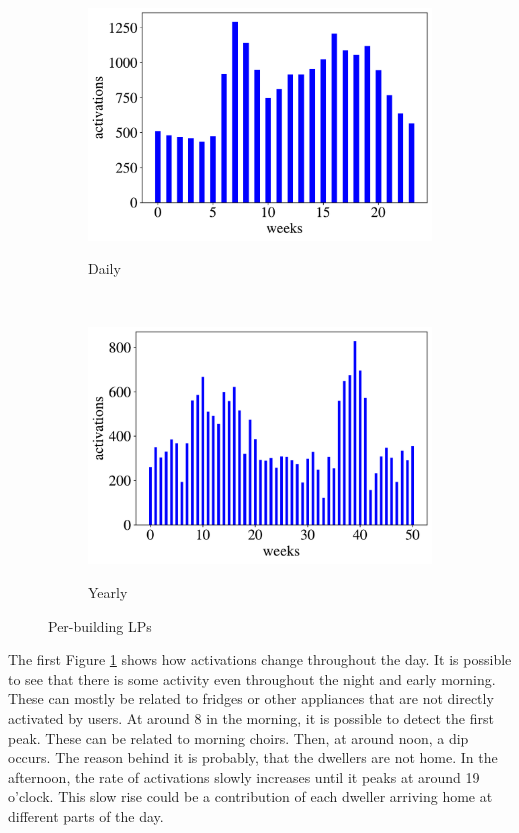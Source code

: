 \begin{figure}[H]
	\begin{subfigure}{.5\textwidth}
		\caption{Daily}
		\includegraphics[width=1\linewidth]{../Figures/LPS/SLPdaily2.pdf}
		\label{fig:SLPdaily2}
	\end{subfigure}%
	~ 
	\begin{subfigure}{.5\textwidth}
		\caption{Yearly}
		\includegraphics[width=1\linewidth]{../Figures/LPS/SLPyearly2.pdf}
		\label{fig:SLPyearly2}
	\end{subfigure}%
	\label{fig:SLP}
	\caption{Per-building LPs}
\end{figure}

The first Figure \ref{fig:SLPdaily2} shows how activations change throughout the day.
It is possible to see that there is some activity even throughout the night and early morning.
These can mostly be related to fridges or other appliances that are not directly activated by users.
At around 8 in the morning, it is possible to detect the first peak. 
These can be related to morning choirs. 
Then, at around noon, a dip occurs. 
The reason behind it is probably, that the dwellers are not home.
In the afternoon, the rate of activations slowly increases until it peaks at around 19 o'clock. 
This slow rise could be a contribution of each dweller arriving home at different parts of the day.

